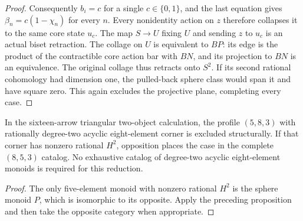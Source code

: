 \begin{proof}
Consequently $b_i=c$ for a single $c\in\{0,1\}$, and the
last equation gives $\beta_n=c(1-\chi_n)$ for every $n$.
Every nonidentity action on $z$ therefore collapses it to the
same core state $u_c$.  The map $S\to U$ fixing $U$ and
sending $z$ to $u_c$ is an actual biset retraction.
The collage on $U$ is equivalent to $BP$: its edge is the
product of the contractible core action bar with $BN$, and
its projection to $BN$ is an equivalence.
The original collage thus retracts onto $S^2$.  If its second
rational cohomology had dimension one, the pulled-back sphere
class would span it and have square zero.  This again excludes
the projective plane, completing every case.
\end{proof}

\begin{corollary}\label{C:sixteen-P5-opposite-eight}
In the sixteen-arrow triangular two-object calculation, the
profile $(5,8,3)$ with rationally degree-two acyclic
eight-element corner is excluded structurally.  If that corner
has nonzero rational $H^2$, opposition places the case in
the complete $(8,5,3)$ catalog.
No exhaustive catalog of degree-two acyclic eight-element
monoids is required for this reduction.
\end{corollary}
\begin{proof}
The only five-element monoid with nonzero rational $H^2$
is the sphere monoid $P$, which is isomorphic to its opposite.
Apply the preceding proposition and then take the opposite
category when appropriate.
\end{proof}

